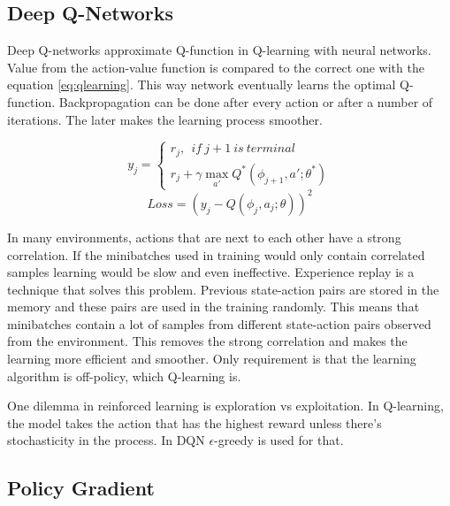 \subsection{Deep Q-Networks}
Deep Q-networks approximate Q-function in Q-learning with neural networks. Value from the action-value function is compared to the correct one with the equation \ref{eq:qlearning}. This way network eventually learns the optimal Q-function. Backpropagation can be done after every action or after a number of iterations. The later makes the learning process smoother. \cite{mnih2015human}

\begin{equation}
    y_j = \left\{
        \begin{array}{l}
            r_j, \:\: if\:j + 1\:is\:terminal \\
            r_j + \gamma \max_{a'} Q^*(\phi_{j+1},a'; \theta^*)
        \end{array}
    \right.
\end{equation}
\begin{equation}
    \label{eq:msedqn}
    Loss = (y_j - Q(\phi_j, a_j; \theta))^2
\end{equation}

In many environments, actions that are next to each other have a strong correlation. If the minibatches used in training would only contain correlated samples learning would be slow and even ineffective. Experience replay is a technique that solves this problem. Previous state-action pairs are stored in the memory and these pairs are used in the training randomly. This means that minibatches contain a lot of samples from different state-action pairs observed from the environment. This removes the strong correlation and makes the learning more efficient and smoother. Only requirement is that the learning algorithm is off-policy, which Q-learning is.

One dilemma in reinforced learning is exploration vs exploitation. In Q-learning, the model takes the action that has the highest reward unless there’s stochasticity in the process. In DQN $\epsilon$-greedy is used for that.

\subsection{Policy Gradient}
